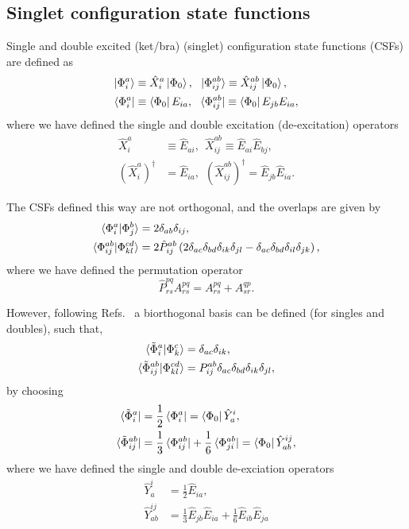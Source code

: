 \documentclass{article}
\begin{document}
\subsection{Singlet configuration state functions}
Single and double excited (ket/bra) (singlet) configuration state functions (CSFs) are defined as 
\begin{align}
   \ket{\Phi^a_i} &\equiv \hat{X}^a_i\ket{\Phi_0}, \ \ \ket{\Phi^{ab}_{ij}} \equiv \hat{X}^{ab}_{ij}\ket{\Phi_0}, \\
   \bra{\Phi^a_i} &\equiv \bra{\Phi_0}E_{ia}, \ \ \bra{\Phi^{ab}_{ij}} \equiv \bra{\Phi_0}E_{jb}E_{ia},
\end{align}
where we have defined the single and double excitation (de-excitation) operators
\begin{align}
    \hat{X}^a_i &\equiv \hat{E}_{ai}, \ \ \hat{X}^{ab}_{ij} \equiv \hat{E}_{ai} \hat{E}_{bj}, \\
    (\hat{X}^a_i)^\dagger &= \hat{E}_{ia}, \ \  (\hat{X}^{ab}_{ij})^\dagger = \hat{E}_{jb} \hat{E}_{ia}.
\end{align}

The CSFs defined this way are not orthogonal, and the overlaps are given by 
\begin{align}
    \braket{\Phi^a_i|\Phi^b_j} &= 2 \delta_{a b} \delta_{i j}, \\
    \braket{\Phi^{ab}_{ij}|\Phi^{cd}_{kl}} &= 2 \hat{P}^{ab}_{ij}\left( 2\delta_{a c} \delta_{b d} \delta_{i k} \delta_{j l}-\delta_{a c} \delta_{b d} \delta_{i l} \delta_{j k} \right),
\end{align}
where we have defined the permutation operator 
\begin{equation}
    \hat{P}^{pq}_{rs} A^{pq}_{rs} = A^{pq}_{rs} + A^{qp}_{sr}. 
\end{equation}

However, following Refs.~\cite{helgaker2013molecular, pulay1984efficient} a biorthogonal basis can be defined (for singles and doubles), such that,
\begin{align}
    \braket{\tilde{\Phi}^a_i|\Phi^c_k} &= \delta_{ac} \delta_{ik}, \\
    \braket{\tilde{\Phi}^{ab}_{ij}|\Phi^{cd}_{kl}} &= P^{ab}_{ij} \delta_{ac}\delta_{bd}\delta_{ik}\delta_{jl},
\end{align}
by choosing 
\begin{align}
    \bra{\tilde{\Phi}^a_i} &= \frac{1}{2} \bra{\Phi^a_i} = \bra{\Phi_0} \hat{Y}^i_a, \\
    \bra{\tilde{\Phi}^{ab}_{ij}} &= \frac{1}{3} \bra{\Phi^{ab}_{ij}} + \frac{1}{6} \bra{\Phi^{ab}_{ji}} = \bra{\Phi_0}\hat{Y}^{ij}_{ab}, 
\end{align}
where we have defined the single and double de-exciation operators
\begin{align}
    \hat{Y}^i_a &= \frac{1}{2} \hat{E}_{ia}, \\
    \hat{Y}^{ij}_{ab} &= \frac{1}{3} \hat{E}_{jb} \hat{E}_{ia} + \frac{1}{6} \hat{E}_{ib} \hat{E}_{ja} 
\end{align}
\end{document}
